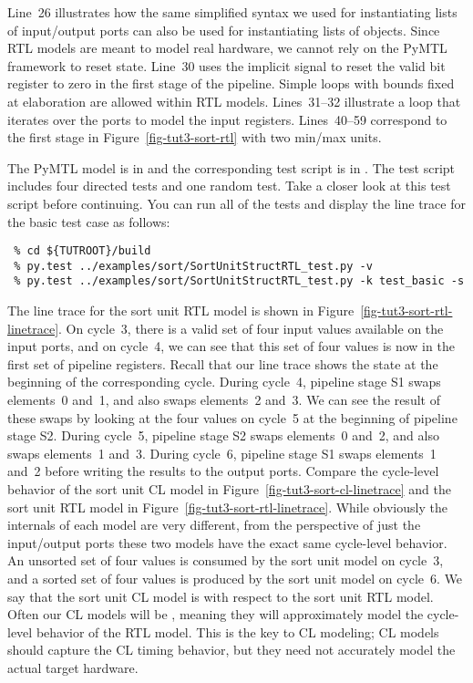 \documentclass{cbxdoc}
\begin{document}
Line~26 illustrates how the same simplified syntax we used for
instantiating lists of input/output ports can also be used for
instantiating lists of  objects. Since RTL models are meant to
model real hardware, we cannot rely on the PyMTL framework to reset
state. Line~30 uses the implicit  signal to reset the valid
bit register to zero in the first stage of the pipeline. Simple loops
with bounds fixed at elaboration are allowed within RTL models.
Lines~31--32 illustrate a loop that iterates over the  ports to
model the input registers. Lines~40--59 correspond to the first stage in
Figure~\ref{fig-tut3-sort-rtl} with two min/max units.

The PyMTL model is in  and the corresponding test
script is in \linebreak {}. The test script
includes four directed tests and one random test. Take a closer look at
this test script before continuing. You can run all of the tests and
display the line trace for the basic test case as follows:

\begin{verbatim}
 % cd ${TUTROOT}/build
 % py.test ../examples/sort/SortUnitStructRTL_test.py -v
 % py.test ../examples/sort/SortUnitStructRTL_test.py -k test_basic -s
\end{verbatim}



The line trace for the sort unit RTL model is shown in
Figure~\ref{fig-tut3-sort-rtl-linetrace}. On cycle~3, there is a valid
set of four input values available on the input ports, and on cycle~4, we
can see that this set of four values is now in the first set of pipeline
registers. Recall that our line trace shows the state at the beginning of
the corresponding cycle. During cycle~4, pipeline stage S1 swaps
elements~0 and~1, and also swaps elements~2 and~3. We can see the result
of these swaps by looking at the four values on cycle~5 at the beginning
of pipeline stage S2. During cycle~5, pipeline stage S2 swaps elements~0
and~2, and also swaps elements~1 and~3. During cycle~6, pipeline stage S1
swaps elements~1 and~2 before writing the results to the output ports.
Compare the cycle-level behavior of the sort unit CL model in
Figure~\ref{fig-tut3-sort-cl-linetrace} and the sort unit RTL model in
Figure~\ref{fig-tut3-sort-rtl-linetrace}. While obviously the internals
of each model are very different, from the perspective of just the
input/output ports these two models have the exact same cycle-level
behavior. An unsorted set of four values is consumed by the sort unit
model on cycle~3, and a sorted set of four values is produced by the sort
unit model on cycle~6. We say that the sort unit CL model is  with respect to the sort unit RTL model. Often our CL models
will be , meaning they will approximately model
the cycle-level behavior of the RTL model. This is the key to CL
modeling; CL models should capture the CL timing behavior, but they need
not accurately model the actual target hardware.
\end{document}
